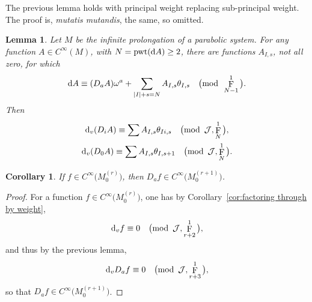 \documentclass[10pt,a4paper]{amsart}
\renewcommand{\d}{{\rm d}}
\newcommand{\cinfinity}[1]{C^\infty\big(#1\big)}
\renewcommand{\mod}[1]{\quad\big(\mathrm{mod\enspace} #1\big)}
\newcommand{\M}[1]{M_0^{(#1)}}
\newcommand{\thetas}[1]{\theta_{#1}}
\DeclareMathOperator{\pwf}{F}
\DeclareMathOperator{\pwt}{\mathrm{pwt}}
\newcommand{\dv}{\ensuremath{\hspace{1pt} \d_v}}
\newcommand{\cartTheta}{\mathcal{J}}
\newcommand{\cMinfty}{C^\infty(M)}
\numberwithin{equation}{section}
\newtheorem{Corollary}[Theorem]{Corollary}
\newtheorem{Lemma}[Theorem]{Lemma}
\begin{document}
The previous lemma holds with principal weight replacing sub-principal weight. The proof is, \textit{mutatis mutandis}, the same, so omitted.
\begin{Lemma}%
 Let $M$ be the infinite prolongation of a parabolic system. For any function $A \in \cMinfty$, with $N = \pwt(\d A) \ge 2$, there are functions $A_{I,s}$, not all zero, for which
 \begin{gather*}
 \d A \equiv (D_aA)\omega^a + \sum_{|I|+s = N} A_{I,s}\thetas{I,s} \mod{\pwf^1_{N-1}} .
 \end{gather*}
 Then
 \begin{gather*}
 \dv(D_i A) \equiv \sum A_{I,s}\thetas{Ii,s} \mod{\cartTheta, \pwf^1_N} ,
 \\
 \dv(D_0 A) \equiv \sum A_{I,s}\thetas{I,s+1} \mod{\cartTheta, \pwf^1_N} .
 \end{gather*}
\end{Lemma}

\begin{Corollary}
 If $f \in \cinfinity{\M{r}}$, then $D_af \in \cinfinity{\M{r+1}}$.
\end{Corollary}
\begin{proof}
 For a function $f \in \cinfinity{\M{r}}$, one has by Corollary~\ref{cor:factoring through by weight},
 \begin{gather*}
 \dv f \equiv 0 \mod{\cartTheta, \pwf^1_{r+2}} ,
 \end{gather*}
 and thus by the previous lemma,
 \begin{gather*}
 \dv D_a f \equiv 0 \mod{\cartTheta, \pwf^1_{r+3}} ,
 \end{gather*}
 so that $D_a f \in \cinfinity{\M{r+1}}$.
\end{proof}
\end{document}

